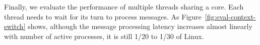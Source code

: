 

Finally, we evaluate the performance of multiple threads sharing a core. Each thread needs to wait for its turn to process messages.
As Figure~\ref{fig:eval-context-switch} shows, although the message processing latency increases almost linearly with number of active processes, it is still 1/20 to 1/30 of Linux.



